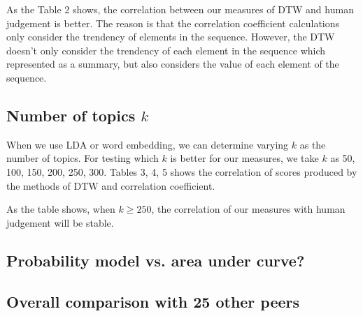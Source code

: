 
As the Table 2 shows, the correlation between our measures of DTW  and human judgement 
is better. The reason is that the correlation coefficient calculations only consider 
the trendency of elements in the sequence. However, the DTW doesn't only consider the 
trendency of each element in the sequence which represented as a summary, but also 
considers the value of each element of the sequence. 

\subsection{Number of topics $k$}

When we use LDA or word embedding, we can determine varying $k$ as the number of topics.
For testing which $k$ is better for our measures, we take $k$ as 50, 100, 150, 200, 250, 300.
Tables 3, 4, 5 shows the correlation of scores produced by the methods of DTW and correlation 
coefficient. 


As the table shows, when $k \geqslant 250$, the correlation of our measures with human judgement
will be stable.

\subsection{Probability model vs. area under curve?}

\subsection{Overall comparison with 25 other peers}

